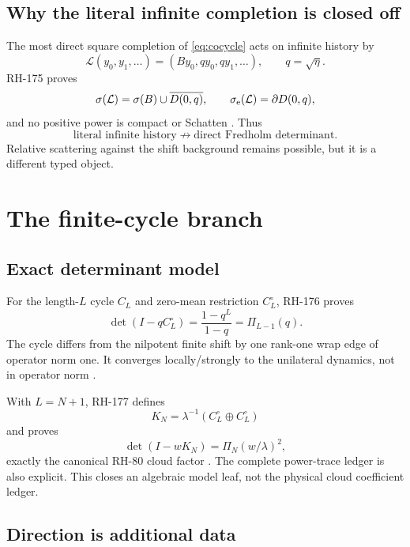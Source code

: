 \documentclass[12pt]{article}
\theoremstyle{remark}
\begin{document}
\subsection{Why the literal infinite completion is closed off}

The most direct square completion of \eqref{eq:cocycle} acts on infinite
history by
\[
 \mathcal L(y_0,y_1,\ldots)
 =(By_0,qy_0,qy_1,\ldots),
 \qquad q=\sqrt\eta.
\]
RH-175 proves
\begin{equation}\label{eq:shift-spectrum}
 \sigma(\mathcal L)=\sigma(B)\cup\overline{D(0,q)},
 \qquad
 \sigma_{\rm e}(\mathcal L)=\partial D(0,q),
\end{equation}
and no positive power is compact or Schatten \citep{WangRH175}.  Thus
\[
 \text{literal infinite history}
 \not\longrightarrow
 \text{direct Fredholm determinant}.
\]
Relative scattering against the shift background remains possible, but it is
a different typed object.

\section{The finite-cycle branch}

\subsection{Exact determinant model}

For the length-$L$ cycle $C_L$ and zero-mean restriction $C_L^\circ$,
RH-176 proves
\begin{equation}\label{eq:cycle-det}
 \det(I-qC_L^\circ)=\frac{1-q^L}{1-q}=\Pi_{L-1}(q).
\end{equation}
The cycle differs from the nilpotent finite shift by one rank-one wrap edge of
operator norm one.  It converges locally/strongly to the unilateral dynamics,
not in operator norm \citep{WangRH176}.

With $L=N+1$, RH-177 defines
\begin{equation}\label{eq:double-cycle}
 K_N=\lambda^{-1}
 (C_L^\circ\oplus C_L^\circ)
\end{equation}
and proves
\begin{equation}\label{eq:rh80-factor}
 \det(I-wK_N)=\Pi_N(w/\lambda)^2,
\end{equation}
exactly the canonical RH-80 cloud factor \citep{WangRH177}.  The complete
power-trace ledger is also explicit.  This closes an algebraic model leaf,
not the physical cloud coefficient ledger.

\subsection{Direction is additional data}
\end{document}
